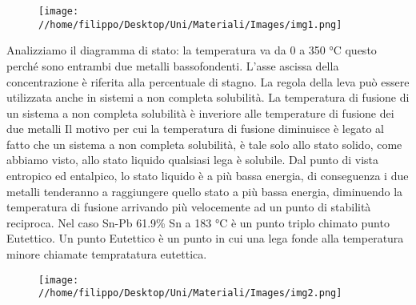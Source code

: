 \documentclass{article}%
\begin{document}
\begin{figure}[H]%
\centering%
\texttt{[image: //home/filippo/Desktop/Uni/Materiali/Images/img1.png]}%
\end{figure}

%
Analizziamo il diagramma di stato: la temperatura va da 0 a 350 °C questo perché sono entrambi due metalli bassofondenti.\newline%
%
L'asse ascissa della concentrazione è riferita alla percentuale di stagno.\newline%
%
La regola della leva può essere utilizzata anche in sistemi a non completa solubilità.\newline%
%
La temperatura di fusione di un sistema a non completa solubilità è inveriore alle temperature di fusione dei due metalli\newline%
%
\newline%
%
Il motivo per cui la temperatura di fusione diminuisce è legato al fatto che un sistema a non completa solubilità, è tale solo allo stato solido, come abbiamo visto, allo stato liquido qualsiasi lega è solubile.\newline%
%
Dal punto di vista entropico ed entalpico, lo stato liquido è a più bassa energia, di conseguenza i due metalli tenderanno a raggiungere quello stato a più bassa energia, diminuendo la temperatura di fusione arrivando più velocemente ad un punto di stabilità reciproca.\newline%
%
\newline%
%
Nel caso Sn{-}Pb 61.9\% Sn a 183 °C è un punto triplo chimato punto Eutettico.\newline%
%
Un punto Eutettico è un punto in cui una lega fonde alla temperatura minore chiamate tempratatura eutettica.\newline%
%
\newline%
%


\begin{figure}[H]%
\centering%
\texttt{[image: //home/filippo/Desktop/Uni/Materiali/Images/img2.png]}%
\end{figure}
\end{document}
